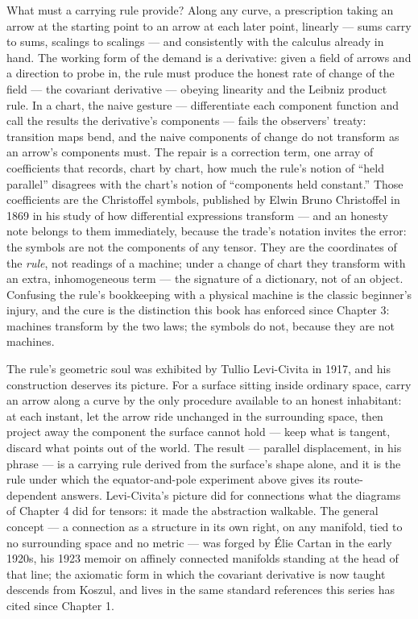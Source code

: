 What must a carrying rule provide? Along any curve, a prescription taking
an arrow at the starting point to an arrow at each later point, linearly
--- sums carry to sums, scalings to scalings --- and consistently with
the calculus already in hand. The working form of the demand is a
derivative: given a field of arrows and a direction to probe in, the rule
must produce the honest rate of change of the field --- the covariant
derivative --- obeying linearity and the Leibniz product rule. In a
chart, the naive gesture --- differentiate each component function and
call the results the derivative's components --- fails the observers'
treaty: transition maps bend, and the naive components of change do not
transform as an arrow's components must. The repair is a correction term,
one array of coefficients that records, chart by chart, how much the
rule's notion of ``held parallel'' disagrees with the chart's notion of
``components held constant.'' Those coefficients are the Christoffel
symbols, published by Elwin Bruno Christoffel in 1869 in his study of how
differential expressions transform --- and an honesty note belongs to
them immediately, because the trade's notation invites the error: the
symbols are not the components of any tensor. They are the coordinates of
the \emph{rule}, not readings of a machine; under a change of chart they
transform with an extra, inhomogeneous term --- the signature of a
dictionary, not of an object. Confusing the rule's bookkeeping with a
physical machine is the classic beginner's injury, and the cure is the
distinction this book has enforced since Chapter 3: machines transform by
the two laws; the symbols do not, because they are not machines.

The rule's geometric soul was exhibited by Tullio Levi-Civita in 1917,
and his construction deserves its picture. For a surface sitting inside
ordinary space, carry an arrow along a curve by the only procedure
available to an honest inhabitant: at each instant, let the arrow ride
unchanged in the surrounding space, then project away the component the
surface cannot hold --- keep what is tangent, discard what points out of
the world. The result --- parallel displacement, in his phrase --- is a
carrying rule derived from the surface's shape alone, and it is the rule
under which the equator-and-pole experiment above gives its
route-dependent answers. Levi-Civita's picture did for connections what
the diagrams of Chapter 4 did for tensors: it made the abstraction
walkable. The general concept --- a connection as a structure in its own
right, on any manifold, tied to no surrounding space and no metric ---
was forged by \'Elie Cartan in the early 1920s, his 1923 memoir on
affinely connected manifolds standing at the head of that line; the
axiomatic form in which the covariant derivative is now taught descends
from Koszul, and lives in the same standard references this series has
cited since Chapter 1.


